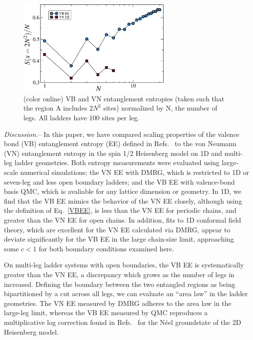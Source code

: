\documentclass[prl,aps,twocolumn,floatfix,amsmath,amssymb,superscriptaddress,tightenlines]{revtex4}
\begin{document}
\begin{figure} { \includegraphics[width=3in]{fig4.eps} \caption{(color
online) VB and VN entanglement entropies (taken such that the region A
includes $2N^2$ sites) normalized by N, the number of legs.  All ladders
have 100 sites per leg.  \label{zigzag}}} \end{figure}

{\it Discussion.}-- In this paper, we have compared scaling properties of
the valence bond (VB) entanglement entropy (EE) defined in
Refs.~\cite{Alet,Chh} to the von Neumann (VN) entanglement entropy in the
spin 1/2 Heisenberg model on 1D and multi-leg ladder geometries.  Both
entropy measurements were evaluated using large-scale numerical
simulations; the VN EE with DMRG, which is restricted to 1D or seven-leg
and less open boundary ladders; and the VB EE with valence-bond basis QMC,
which is avaliable for any lattice dimension or geometry. In 1D, we find
that the VB EE mimics the behavior of the VN EE closely, although using
the definition of Eq.~\eqref{VBEE}, is less than the VN EE for periodic
chains, and greater than the VN EE for open chains. In addition, fits to
1D conformal field theory, which are excellent for the VN EE calculated
via DMRG, appear to deviate significantly for the VB EE in the large
chain-size limit, approaching some $c<1$ for both boundary conditions
examined here.

On multi-leg ladder systems with open boundaries, the VB EE is
systematically greater than the VN EE, a discrepancy which grows as the
number of legs in increased.  Defining the boundary between the two
entangled regions as being bipartitioned by a cut across all legs, we can
evaluate an ``area law'' in the ladder geometries.  The VN EE measured by
DMRG adheres to the area law in the large-leg limit, whereas the VB EE
measured by QMC reproduces a multiplicative log correction found in
Refs.~\cite{Alet,Chh} for the N\'eel groundstate of the 2D Heisenberg
model.
\end{document}
